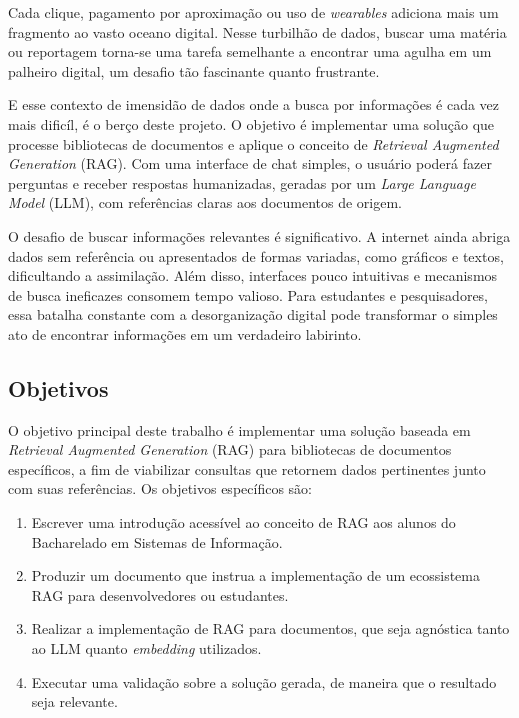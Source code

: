 \documentclass[a4paper, 12pt]{article}
\begin{document}
    Cada clique, pagamento por aproximação ou uso de \textit{wearables} adiciona mais um fragmento ao vasto oceano digital. Nesse turbilhão de dados, buscar uma matéria ou reportagem torna-se uma tarefa semelhante a encontrar uma agulha em um palheiro digital, um desafio tão fascinante quanto frustrante.

    E esse contexto de imensidão de dados onde a busca por informações é cada vez mais dificíl, é o berço deste projeto. O objetivo é implementar uma solução que processe bibliotecas de documentos e aplique o conceito de \textit{Retrieval Augmented Generation} (RAG). Com uma interface de chat simples, o usuário poderá fazer perguntas e receber respostas humanizadas, geradas por um \textit{Large Language Model} (LLM), com referências claras aos documentos de origem.

    O desafio de buscar informações relevantes é significativo. A internet ainda abriga dados sem referência ou apresentados de formas variadas, como gráficos e textos, dificultando a assimilação. Além disso, interfaces pouco intuitivas e mecanismos de busca ineficazes consomem tempo valioso. Para estudantes e pesquisadores, essa batalha constante com a desorganização digital pode transformar o simples ato de encontrar informações em um verdadeiro labirinto.

    \subsection{Objetivos} \label{sec:objectives}

    O objetivo principal deste trabalho é implementar uma solução baseada em \textit{Retrieval Augmented Generation} (RAG) para bibliotecas de documentos específicos, a fim de viabilizar consultas que retornem dados pertinentes junto com suas referências. Os objetivos específicos são:
    
    \begin{enumerate}
        \item Escrever uma introdução acessível ao conceito de RAG aos alunos do Bacharelado em Sistemas de Informação.
        \item Produzir um documento que instrua a implementação de um ecossistema RAG para desenvolvedores ou estudantes.
        \item Realizar a implementação de RAG para documentos, que seja agnóstica tanto ao LLM quanto \textit{embedding} utilizados.
        \item Executar uma validação sobre a solução gerada, de maneira que o resultado seja relevante.
    \end{enumerate}
\end{document}
